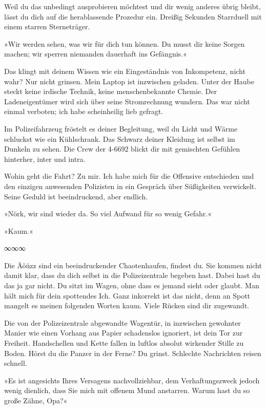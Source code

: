 Weil du das unbedingt ausprobieren möchtest und dir wenig anderes übrig bleibt, lässt du dich auf die herablassende Prozedur ein. Dreißig Sekunden Starrduell mit einem starren Sterneträger.

»Wir werden sehen, was wir für dich tun können. Du musst dir keine Sorgen machen; wir sperren niemanden dauerhaft ins Gefängnis.«

Das klingt mit deinem Wissen wie ein Eingeständnis von Inkompetenz, nicht wahr? Nur nicht grinsen. Mein Laptop ist inzwischen geladen. Unter der Haube steckt keine irdische Technik, keine menschenbekannte Chemie. Der Ladeneigentümer wird sich über seine Stromrechnung wundern. Das war nicht einmal verboten; ich habe scheinheilig lieb gefragt.

Im Polizeifahrzeug fröstelt es deiner Begleitung, weil du Licht und Wärme schluckst wie ein Kühlschrank. Das Schwarz deiner Kleidung ist selbst im Dunkeln zu sehen. Die Crew der 4-6692 blickt dir mit gemischten Gefühlen hinterher, inter und intra.

Wohin geht die Fahrt? Zu mir. Ich habe mich für die Offensive entschieden und den einzigen anwesenden Polizisten in ein Gespräch über Süßigkeiten verwickelt. Seine Geduld ist beeindruckend, aber endlich.

»Nörk, wir sind wieder da. So viel Aufwand für so wenig Gefahr.«

»Kaum.«

\begin{center}
∞∞∞
\end{center}

Die Äöüzz sind ein beeindruckender Chaotenhaufen, findest du. Sie kommen nicht damit klar, dass du dich selbst in die Polizeizentrale begeben hast. Dabei hast du das ja gar nicht. Du sitzt im Wagen, ohne dass es jemand sieht oder glaubt. Man hält mich für dein spottendes Ich. Ganz inkorrekt ist das nicht, denn an Spott mangelt es meinen folgenden Worten kaum. Viele Rücken sind dir zugewandt.

Die von der Polizeizentrale abgewandte Wagentür, in inzwischen gewohnter Manier wie einen Vorhang aus Papier schadenslos ignoriert, ist dein Tor zur Freiheit. Handschellen und Kette fallen in luftlos absolut wirkender Stille zu Boden. Hörst du die Panzer in der Ferne? Du grinst. Schlechte Nachrichten reisen schnell.

»Es ist angesichts Ihres Versagens nachvollziehbar, dem Verhaftungszweck jedoch wenig dienlich, dass Sie mich mit offenem Mund anstarren. Warum hast du so große Zähne, Opa?«


